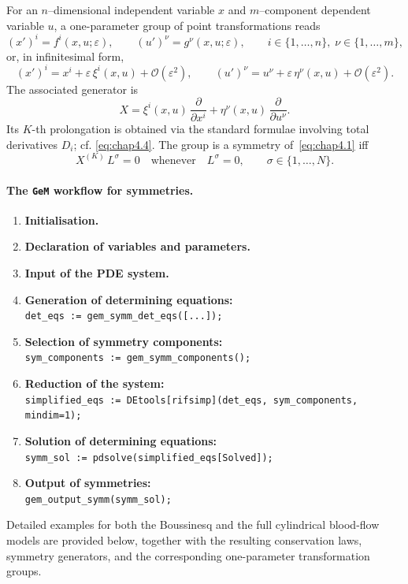 \documentclass[alpha-refs, 12pt]{wiley-article}
\newcommand{\pd}[2]{\frac{\partial #1}{\partial #2}}
\begin{document}
For an $n$–dimensional independent variable $x$ and $m$–component dependent variable $u$, a one-parameter group of point transformations reads
\[
  (x')^{i}=f^{i}(x,u;\varepsilon), \qquad
  (u')^{\nu}=g^{\nu}(x,u;\varepsilon),
  \qquad
  i \in \{1,\dots,n\},\;
  \nu \in \{1,\dots,m\},
\]
or, in infinitesimal form,
\[
  (x')^{i}=x^{i}+\varepsilon\,\xi^{i}(x,u)+\mathcal{O}(\varepsilon^{2}),\qquad
  (u')^{\nu}=u^{\nu}+\varepsilon\,\eta^{\nu}(x,u)+\mathcal{O}(\varepsilon^{2}).
\]
The associated generator is
\[
  X=\xi^{i}(x,u)\,\pd{}{x^{i}}+\eta^{\nu}(x,u)\,\pd{}{u^{\nu}}.
\]
Its $K$-th prolongation is obtained via the standard formulae involving total derivatives $D_{i}$; cf. \eqref{eq:chap4.4}. The group is a symmetry of~\eqref{eq:chap4.1} iff
\[
  X^{(K)}\,L^{\sigma}=0
  \quad\text{whenever}\quad
  L^{\sigma}=0,
  \qquad \sigma \in \{1,\dots,N\}.
\]

\paragraph{The \texttt{GeM} workflow for symmetries.}
\begin{enumerate}[label=(\roman*)]
  \item \textbf{Initialisation.}
  \item \textbf{Declaration of variables and parameters.}
  \item \textbf{Input of the PDE system.}
  \item \textbf{Generation of determining equations:}\\
        \verb|det_eqs := gem_symm_det_eqs([...]);|
  \item \textbf{Selection of symmetry components:}\\
        \verb|sym_components := gem_symm_components();|
  \item \textbf{Reduction of the system:}\\
        \verb|simplified_eqs := DEtools[rifsimp](det_eqs, sym_components, mindim=1);|
  \item \textbf{Solution of determining equations:}\\
        \verb|symm_sol := pdsolve(simplified_eqs[Solved]);|
  \item \textbf{Output of symmetries:}\\
        \verb|gem_output_symm(symm_sol);|
\end{enumerate}

Detailed examples for both the Boussinesq and the full cylindrical blood-flow models are provided below, together with the resulting conservation laws, symmetry generators, and the corresponding one-parameter transformation groups.
\end{document}
